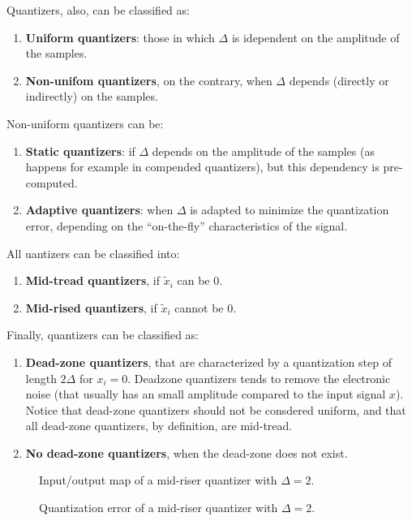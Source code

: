 Quantizers, also, can be classified as:
\begin{enumerate}
\item \textbf{Uniform quantizers}: those in which $\Delta$ is
  idependent on the amplitude of the samples.
\item \textbf{Non-unifom quantizers}, on the contrary, when $\Delta$
  depends (directly or indirectly) on the samples.
\end{enumerate}

Non-uniform quantizers can be:
\begin{enumerate}
\item \textbf{Static quantizers}: if $\Delta$ depends on the amplitude
  of the samples (as happens for example in compended quantizers), but
  this dependency is pre-computed.
\item \textbf{Adaptive quantizers}: when $\Delta$ is adapted to
  minimize the quantization error, depending on the ``on-the-fly''
  characteristics of the signal.
\end{enumerate}

All uantizers can be classified into:
\begin{enumerate}
\item \textbf{Mid-tread quantizers}, if $\tilde{x}_i$ can be $0$.
\item \textbf{Mid-rised quantizers}, if $\tilde{x}_i$ cannot be $0$.
\end{enumerate}

Finally, quantizers can be classified as:
\begin{enumerate}
\item \textbf{Dead-zone quantizers}, that are characterized by a
  quantization step of length $2\Delta$ for $x_i=0$. Deadzone
  quantizers tends to remove the electronic noise (that usually has an
  small amplitude compared to the input signal $x$). Notice that
  dead-zone quantizers should not be consdered uniform, and that all
  dead-zone quantizers, by definition, are mid-tread.
\item \textbf{No dead-zone quantizers}, when the dead-zone does not
  exist.
\end{enumerate}

\begin{figure}
  \centering
  \caption{Input/output map of a mid-riser quantizer with $\Delta=2$.}
  \label{fig:iomap_mr}
\end{figure}

\begin{figure}
  \centering
  \caption{Quantization error of a mid-riser quantizer with $\Delta=2$.}
  \label{fig:qe_mr}
\end{figure}

